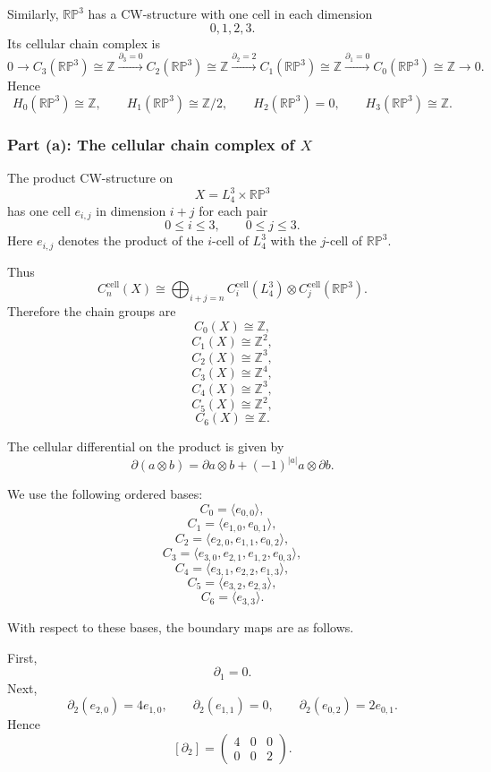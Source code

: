 \documentclass[12pt,a4paper]{article}
\theoremstyle{notespace}
\begin{document}
Similarly, \(\mathbb{RP}^3\) has a CW-structure with one cell in each dimension
\[
0,1,2,3.
\]
Its cellular chain complex is
\[
0
\longrightarrow C_3(\mathbb{RP}^3)\cong \mathbb Z
\xrightarrow{\partial_3=0}
C_2(\mathbb{RP}^3)\cong \mathbb Z
\xrightarrow{\partial_2=2}
C_1(\mathbb{RP}^3)\cong \mathbb Z
\xrightarrow{\partial_1=0}
C_0(\mathbb{RP}^3)\cong \mathbb Z
\longrightarrow 0.
\]
Hence
\[
H_0(\mathbb{RP}^3)\cong \mathbb Z,
\qquad
H_1(\mathbb{RP}^3)\cong \mathbb Z/2,
\qquad
H_2(\mathbb{RP}^3)=0,
\qquad
H_3(\mathbb{RP}^3)\cong \mathbb Z.
\]

\subsubsection{Part (a): The cellular chain complex of \(X\)}

The product CW-structure on
\[
X=L_4^3\times \mathbb{RP}^3
\]
has one cell \(e_{i,j}\) in dimension \(i+j\) for each pair
\[
0\leq i\leq 3,
\qquad
0\leq j\leq 3.
\]
Here \(e_{i,j}\) denotes the product of the \(i\)-cell of \(L_4^3\) with the \(j\)-cell of \(\mathbb{RP}^3\).

Thus
\[
C_n^{\mathrm{cell}}(X)
\cong
\bigoplus_{i+j=n}
C_i^{\mathrm{cell}}(L_4^3)\otimes C_j^{\mathrm{cell}}(\mathbb{RP}^3).
\]
Therefore the chain groups are
\[
C_0(X)\cong \mathbb Z,
\]
\[
C_1(X)\cong \mathbb Z^2,
\]
\[
C_2(X)\cong \mathbb Z^3,
\]
\[
C_3(X)\cong \mathbb Z^4,
\]
\[
C_4(X)\cong \mathbb Z^3,
\]
\[
C_5(X)\cong \mathbb Z^2,
\]
\[
C_6(X)\cong \mathbb Z.
\]

The cellular differential on the product is given by
\[
\partial(a\otimes b)
=
\partial a\otimes b
+
(-1)^{|a|}a\otimes \partial b.
\]

We use the following ordered bases:
\[
C_0=\langle e_{0,0}\rangle,
\]
\[
C_1=\langle e_{1,0},e_{0,1}\rangle,
\]
\[
C_2=\langle e_{2,0},e_{1,1},e_{0,2}\rangle,
\]
\[
C_3=\langle e_{3,0},e_{2,1},e_{1,2},e_{0,3}\rangle,
\]
\[
C_4=\langle e_{3,1},e_{2,2},e_{1,3}\rangle,
\]
\[
C_5=\langle e_{3,2},e_{2,3}\rangle,
\]
\[
C_6=\langle e_{3,3}\rangle.
\]

With respect to these bases, the boundary maps are as follows.

First,
\[
\partial_1=0.
\]
Next,
\[
\partial_2(e_{2,0})=4e_{1,0},
\qquad
\partial_2(e_{1,1})=0,
\qquad
\partial_2(e_{0,2})=2e_{0,1}.
\]
Hence
\[
[\partial_2]
=
\begin{pmatrix}
	4 & 0 & 0\\
	0 & 0 & 2
\end{pmatrix}.
\]
\end{document}
